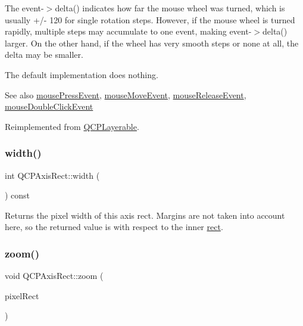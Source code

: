 The {\ttfamily event-\/$>$delta()} indicates how far the mouse wheel was turned, which is usually +/-\/ 120 for single rotation steps. However, if the mouse wheel is turned rapidly, multiple steps may accumulate to one event, making {\ttfamily event-\/$>$delta()} larger. On the other hand, if the wheel has very smooth steps or none at all, the delta may be smaller.

The default implementation does nothing.

\begin{DoxySeeAlso}{See also}
\hyperlink{class_q_c_p_axis_rect_aa9a7c807eaa4666870ac94aa6abc4dde}{mouse\+Press\+Event}, \hyperlink{class_q_c_p_axis_rect_a9cd27ad8c5cfb49aefd9dbb30def4beb}{mouse\+Move\+Event}, \hyperlink{class_q_c_p_axis_rect_a6c89b988d3a0b93c0878f0ebdb5037f4}{mouse\+Release\+Event}, \hyperlink{class_q_c_p_layerable_a4171e2e823aca242dd0279f00ed2de81}{mouse\+Double\+Click\+Event} 
\end{DoxySeeAlso}


Reimplemented from \hyperlink{class_q_c_p_layerable_a47dfd7b8fd99c08ca54e09c362b6f022}{Q\+C\+P\+Layerable}.

\mbox{\label{class_q_c_p_axis_rect_a204645398a4f9d0b0189385c7c2cfb91}} 
\subsubsection{\texorpdfstring{width()}{width()}}
{\footnotesize\ttfamily int Q\+C\+P\+Axis\+Rect\+::width (\begin{DoxyParamCaption}{ }\end{DoxyParamCaption}) const\hspace{0.3cm}{\ttfamily [inline]}}

Returns the pixel width of this axis rect. Margins are not taken into account here, so the returned value is with respect to the inner \hyperlink{class_q_c_p_layout_element_a208effccfe2cca4a0eaf9393e60f2dd4}{rect}. \mbox{\label{class_q_c_p_axis_rect_a5fc8460564e81dcc2a9343dc8bc1fe67}} 
\subsubsection{\texorpdfstring{zoom()}{zoom()}\hspace{0.1cm}{\footnotesize\ttfamily [1/2]}}
{\footnotesize\ttfamily void Q\+C\+P\+Axis\+Rect\+::zoom (\begin{DoxyParamCaption}\item[{const Q\+RectF \&}]{pixel\+Rect }\end{DoxyParamCaption})}


